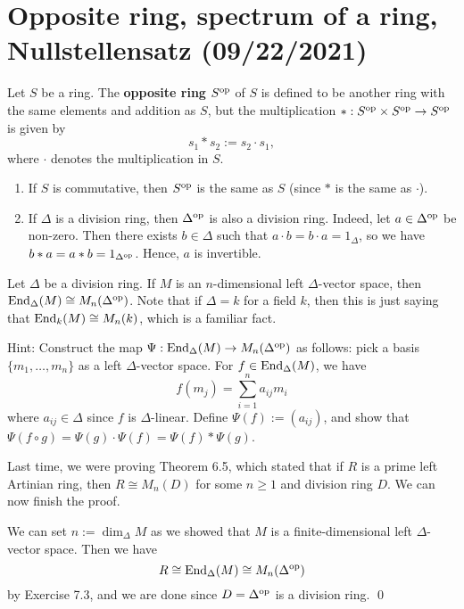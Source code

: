 \section{Opposite ring, spectrum of a ring, Nullstellensatz (09/22/2021)}

\begin{defn}{}
Let $S$ be a ring. The {\bf opposite ring} $S^{\operatorname{op}}$ of $S$ is defined to be another ring with 
the same elements and addition as $S$, but the multiplication $* : S^{\operatorname{op}} \times S^{\operatorname{op}} \to S^{\operatorname{op}}$ is given by 
\[ s_1 * s_2 := s_2 \cdot s_1, \]
where $\cdot$ denotes the multiplication in $S$. 
\end{defn}

\begin{remark}{}
\begin{enumerate}[(1)]
    \item If $S$ is commutative, then $S^{\operatorname{op}}$ is the same as $S$ (since $*$ is the same as $\cdot$).
    \item If $\Delta$ is a division ring, then $\Delta^{\operatorname{op}}$ is also a division ring. Indeed, 
    let $a \in \Delta^{\operatorname{op}}$ be non-zero. Then there exists $b \in \Delta$ such that 
    $a \cdot b = b \cdot a = 1_\Delta$, so we have $b * a = a * b = 1_{\Delta^{\operatorname{op}}}$. Hence, 
    $a$ is invertible. 
\end{enumerate}
\end{remark}

\begin{exercise}{}
Let $\Delta$ be a division ring. If $M$ is an $n$-dimensional left $\Delta$-vector space, then 
$\operatorname{End}_\Delta(M) \cong M_n(\Delta^{\operatorname{op}})$. Note that if $\Delta = k$ for a field $k$, then this is just saying that $\operatorname{End}_k(M) \cong M_n(k)$, which is a familiar fact.

Hint: Construct the map $\Psi : \operatorname{End}_\Delta(M) \to M_n(\Delta^{\operatorname{op}})$ as follows: pick a basis 
$\{m_1, \dots, m_n\}$ as a left $\Delta$-vector space. For $f \in \operatorname{End}_\Delta(M)$, we have 
\[ f(m_j) = \sum_{i=1}^n a_{ij} m_i \]
where $a_{ij} \in \Delta$ since $f$ is $\Delta$-linear. Define $\Psi(f) := (a_{ij})$, and 
show that $\Psi(f \circ g) = \Psi(g) \cdot \Psi(f) = \Psi(f) * \Psi(g)$. 
\end{exercise}

Last time, we were proving Theorem 6.5, which stated that if $R$ is a prime left Artinian ring, 
then $R \cong M_n(D)$ for some $n \geq 1$ and division ring $D$. We can now finish the proof. 

We can set $n := \dim_\Delta M$ as we showed that $M$ is a finite-dimensional left $\Delta$-vector space.
Then we have 
\[ R \cong \operatorname{End}_\Delta(M) \cong M_n(\Delta^{\operatorname{op}}) \]
by Exercise 7.3, and we are done since $D = \Delta^{\operatorname{op}}$ is a division ring. \qed


